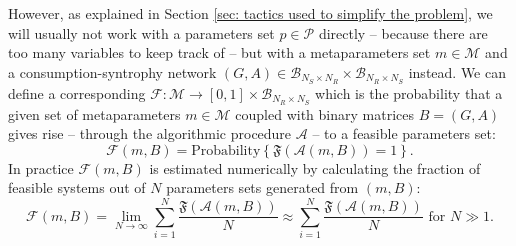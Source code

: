 \documentclass[12pt, titlepage]{report}
\begin{document}
However, as explained in Section \ref{sec: tactics used to simplify the problem}, we will usually not work with a parameters set $p \in \mathcal{P}$ directly -- because there are too many variables to keep track of -- but with a metaparameters set $m \in \mathcal{M}$ and a consumption-syntrophy network $(G,A) \in \mathcal{B}_{N_S \times N_R} \times \mathcal{B}_{N_R \times N_S}$ instead. We can  define a corresponding
 $\mathcal{F} : \mathcal{M} \rightarrow [0, 1] \times \mathcal{B}_{N_R \times N_S}$ which is the probability that a given set of metaparameters $m \in \mathcal{M}$ coupled with binary matrices $B=(G, A)$ gives rise -- through the algorithmic procedure $\mathcal{A}$ -- to a feasible parameters set:
\begin{equation}{
\mathcal{F}(m, B)=\text{Probability}\left\{\mathfrak{F}\left(\mathcal{A}(m, B)\right)=1\right\}. \label{eq : feasibility methods feasibility metaparameters function}
}
\end{equation}
In practice $\mathcal{F}(m, B)$ is estimated numerically by calculating the fraction of feasible systems out of $N$ parameters sets generated from $(m,B)$:
\begin{equation}
\mathcal{F}(m, B) = \lim_{N\rightarrow \infty} \sum_{i=1}^N \frac{\mathfrak{F}(\mathcal{A}(m,B))}{N} \approx \sum_{i=1}^N \frac{\mathfrak{F}(\mathcal{A}(m,B))}{N} \text{ for } N \gg 1.\label{eq : estimate functions numerically}
\end{equation}
\end{document}
